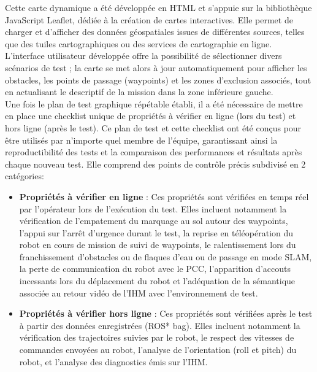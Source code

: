 Cette carte dynamique a été développée en HTML et s'appuie sur la bibliothèque JavaScript Leaflet, dédiée à la création de cartes interactives. Elle permet de charger et d'afficher des données géospatiales issues de différentes sources, telles que des tuiles cartographiques ou des services de cartographie en ligne. L'interface utilisateur développée offre la possibilité de sélectionner divers scénarios de test ; la carte se met alors à jour automatiquement pour afficher les obstacles, les points de passage (waypoints) et les zones d'exclusion associés, tout en actualisant le descriptif de la mission dans la zone inférieure gauche.\\

\indent Une fois le plan de test graphique répétable établi, il a été nécessaire de mettre en place une checklist unique de propriétés à vérifier en ligne (lors du test) et hors ligne (après le test). Ce plan de test et cette checklist ont été conçus pour être utilisés par n'importe quel membre de l'équipe, garantissant ainsi la reproductibilité des tests et la comparaison des performances et résultats après chaque nouveau test. Elle comprend des points de contrôle précis subdivisé en 2 catégories: \\

\begin{itemize}
\renewcommand{\labelitemi}{$\bullet$}
    \item \textbf{Propriétés à vérifier en ligne} : Ces propriétés sont vérifiées en temps réel par l'opérateur lors de l'exécution du test. Elles incluent notamment la vérification de l'empatement du marquage au sol autour des waypoints, l'appui sur l'arrêt d'urgence durant le test, la reprise en téléopération du robot en cours de mission de suivi de waypoints, le ralentissement lors du franchissement d'obstacles ou de flaques d'eau ou de passage en mode SLAM, la perte de communication du robot avec le PCC, l'apparition d'accouts incessants lors du déplacement du robot et l'adéquation de la sémantique associée au retour vidéo de l'IHM avec l'environnement de test.
    \item \textbf{Propriétés à vérifier hors ligne} : Ces propriétés sont vérifiées après le test à partir des données enregistrées (ROS* bag). Elles incluent notamment la vérification des trajectoires suivies par le robot, le respect des vitesses de commandes envoyées au robot, l'analyse de l'orientation (roll et pitch) du robot, et l'analyse des diagnostics émis sur l'IHM.\\
\end{itemize}

